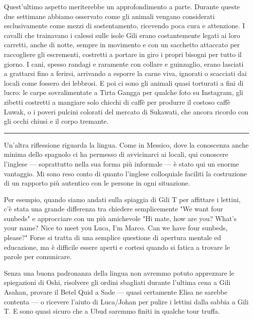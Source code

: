 Quest'ultimo aspetto meriterebbe un approfondimento a parte. Durante queste due settimane abbiamo osservato come gli animali vengano considerati esclusivamente come mezzi di sostentamento, ricevendo poca cura e attenzione. I cavalli che trainavano i calessi sulle isole Gili erano costantemente legati ai loro carretti, anche di notte, sempre in movimento e con un sacchetto attaccato per raccogliere gli escrementi, costretti a portare in giro i propri bisogni per tutto il giorno. I cani, spesso randagi e raramente con collare e guinzaglio, erano lasciati a grattarsi fino a ferirsi, arrivando a esporre la carne viva, ignorati o scacciati dai locali come fossero dei lebbrosi. E poi ci sono gli animali quasi torturati a fini di lucro: le carpe sovralimentate a Tirta Gangga per qualche foto su Instagram, gli zibetti costretti a mangiare solo chicchi di caffè per produrre il costoso caffè Luwak, o i poveri pulcini colorati del mercato di Sukawati, che ancora ricordo con gli occhi chiusi e il corpo tremante.

\begin{center}
    \noindent\rule{0.6\textwidth}{0.4pt}
\end{center}

Un'altra riflessione riguarda la lingua. Come in Messico, dove la conoscenza anche minima dello spagnolo ci ha permesso di avvicinarci ai locali, qui conoscere l'inglese — soprattutto nella sua forma più informale — è stato qui un enorme vantaggio. Mi sono reso conto di quanto l'inglese colloquiale faciliti la costruzione di un rapporto più autentico con le persone in ogni situazione.

Per esempio, quando siamo andati sulla spiaggia di Gili T per affittare i lettini, c'è stata una grande differenza tra chiedere semplicemente "We want four sunbeds" e approcciare con un più amichevole "Hi mate, how are you? What's your name? Nice to meet you Luca, I'm Marco. Can we have four sunbeds, please?" Forse si tratta di una semplice questione di apertura mentale ed educazione, ma è difficile essere aperti e cortesi quando si fatica a trovare le parole per comunicare.

Senza una buona padronanza della lingua non avremmo potuto apprezzare le spiegazioni di Oshi, risolvere gli ordini sbagliati durante l'ultima cena a Gili Asahan, provare il Betel Quid a Sade — quasi certamente Elisa ne sarebbe contenta — o ricevere l'aiuto di Luca/Johan per pulire i lettini dalla sabbia a Gili T. E sono quasi sicuro che a Ubud saremmo finiti in qualche tour truffa.

